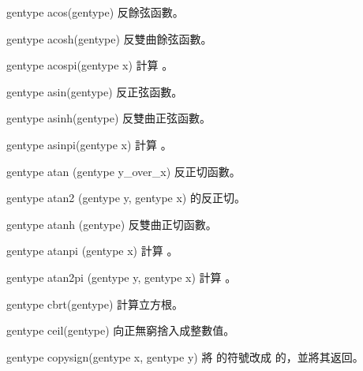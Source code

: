gentype acos(gentype)
\stopbuffer
{}
反餘弦函數。
\stopbuffer

gentype acosh(gentype)
\stopbuffer
{}
反雙曲餘弦函數。
\stopbuffer

gentype acospi(gentype x)
\stopbuffer
{}
計算 。
\stopbuffer

gentype asin(gentype)
\stopbuffer
{}
反正弦函數。
\stopbuffer

gentype asinh(gentype)
\stopbuffer
{}
反雙曲正弦函數。
\stopbuffer

gentype asinpi(gentype x)
\stopbuffer
{}
計算 。
\stopbuffer

gentype atan (gentype y_over_x)
\stopbuffer
{}
反正切函數。
\stopbuffer

gentype atan2 (gentype y,
		gentype x)
\stopbuffer
{}
 的反正切。
\stopbuffer

gentype atanh (gentype)
\stopbuffer
{}
反雙曲正切函數。
\stopbuffer

gentype atanpi (gentype x)
\stopbuffer
{}
計算 。
\stopbuffer

gentype atan2pi (gentype y,
		gentype x)
\stopbuffer
{}
計算 。
\stopbuffer

gentype cbrt(gentype)
\stopbuffer
{}
計算立方根。
\stopbuffer

gentype ceil(gentype)
\stopbuffer
{}
向正無窮捨入成整數值。
\stopbuffer

gentype copysign(gentype x,
		 gentype y)
\stopbuffer
{}
將  的符號改成  的，並將其返回。
\stopbuffer

